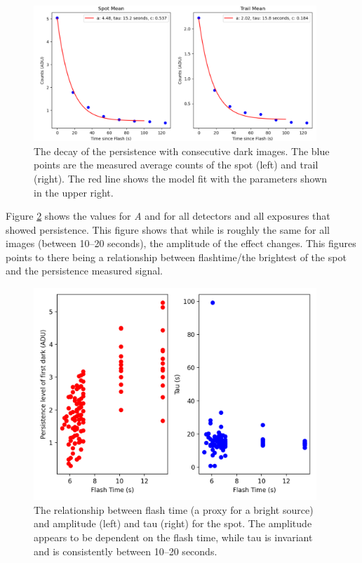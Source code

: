 \documentclass[DM,authoryear,toc]{lsstdoc}
\begin{document}
\begin{figure}[!htp]
  \centering
  \includegraphics[width=0.95\textwidth, angle=0]{Run_6_decay.png}
  \caption{
  The decay of the persistence with consecutive dark images. 
  The blue points are the measured average counts of the spot (left) and trail (right).
  The red line shows the model fit with the parameters shown in the upper right.
  }\label{fig:Run6_decay}
\end{figure}

Figure \ref{fig:Pers_Flash_Tau} shows the values for \textit{A} and \textit{\tau} for all detectors and all exposures that showed persistence. 
This figure shows that while \textit{\tau} is roughly the same for all images (between 10--20 seconds), the amplitude of the effect changes.
This figures points to there being a relationship between flashtime/the brightest of the spot and the persistence measured signal.

\begin{figure}[!htp]
  \centering
  \includegraphics[width=0.95\textwidth, angle=0]{Persistence_Flash_Tau.png}
  \caption{
  The relationship between flash time (a proxy for a bright source) and amplitude (left) and tau (right) for the spot. 
  The amplitude appears to be dependent on the flash time, while tau is invariant and is consistently between 10--20 seconds. 
  }\label{fig:Pers_Flash_Tau}
\end{figure}
\end{document}

